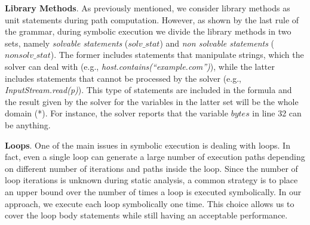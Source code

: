 \noindent
\textbf{Library Methods}. As previously mentioned, we consider library methods as unit statements during path computation. However, as shown by the last rule of the grammar, during symbolic execution we divide the library methods in two sets, namely \emph{solvable statements} ($solv\_stat$) and \emph{non solvable statements} ($nonsolv\_stat$). The former includes statements that manipulate strings, which the solver can deal with (e.g., \emph{host.contains(``example.com'')}), while the latter includes statements that cannot be processed by the solver (e.g., \emph{InputStream.read(p)}). This type of statements are included in the formula and the result given by the solver for the variables in the latter set will be the whole domain (*). For instance, the solver reports that the variable $bytes$ in line 32 can be anything. 

\noindent
\textbf{Loops}. One of the main issues in symbolic execution is dealing with loops. In fact, even a single loop can generate a large number of execution paths depending on different number of iterations and paths inside the loop. Since the number of loop iterations is unknown during static analysis, a common strategy is to place an upper bound over the number of times a loop is executed symbolically. In our approach, we execute each loop symbolically one time. This choice allows us to cover the loop body statements while still having an acceptable performance.













